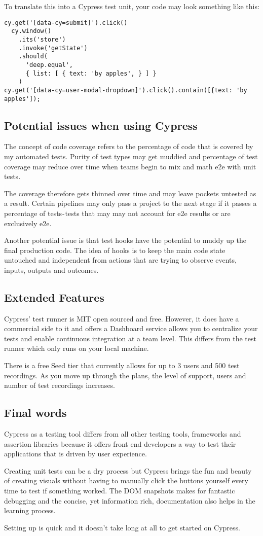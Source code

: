 To translate this into a Cypress test unit, your code may look something like this:

\begin{lstlisting}
cy.get('[data-cy=submit]').click()
  cy.window()
    .its('store')
    .invoke('getState')
    .should(
      'deep.equal',
      { list: [ { text: 'by apples', } ] }
    )
cy.get('[data-cy=user-modal-dropdown]').click().contain([{text: 'by apples']);
\end{lstlisting}

\subsection{ Potential issues when using Cypress }
The concept of code coverage refers to the percentage of code that is covered
by my automated tests. Purity of test types may get muddied and percentage of
test coverage may reduce over time when teams begin to mix and math e2e with
unit tests.

The coverage therefore gets thinned over time and may leave pockets untested as
a result. Certain pipelines may only pass a project to the next stage if it
passes a percentage of tests - tests that may may not account for e2e results
or are exclusively e2e.

Another potential issue is that test hooks have the potential to muddy up the
final production code. The idea of hooks is to keep the main code state
untouched and independent from actions that are trying to observe events,
inputs, outputs and outcomes.

\subsection{ Extended Features }
Cypress' test runner is MIT open sourced and free. However, it does have a
commercial side to it and offers a Dashboard service allows you to centralize
your tests and enable continuous integration at a team level. This differs from
the test runner which only runs on your local machine.

There is a free Seed tier that currently allows for up to 3 users and 500 test
recordings. As you move up through the plans, the level of support, users and
number of test recordings increases.

\subsection{ Final words }

Cypress as a testing tool differs from all other testing tools, frameworks and
assertion libraries because it offers front end developers a way to test their
applications that is driven by user experience.

Creating unit tests can be a dry process but Cypress brings the fun and beauty
of creating visuals without having to manually click the buttons yourself every
time to test if something worked. The DOM snapshots makes for fantastic
debugging and the concise, yet information rich, documentation also helps in
the learning process.

Setting up is quick and it doesn't take long at all to get started on Cypress.
